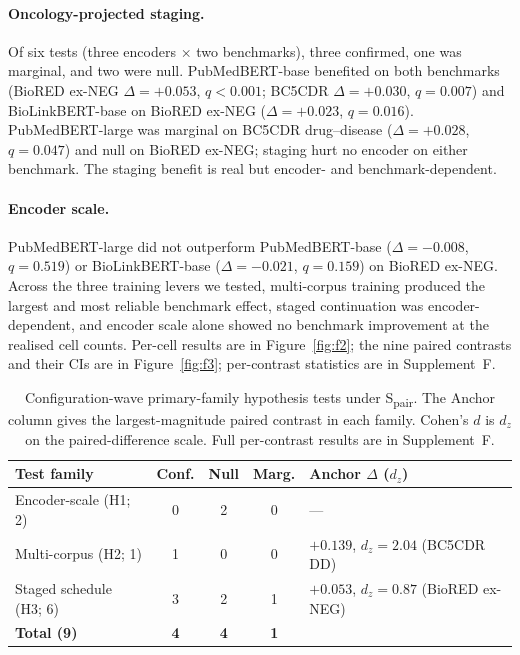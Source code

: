 \paragraph{Oncology-projected staging.}
Of six tests (three encoders \(\times\) two benchmarks), three
confirmed, one was marginal, and two were null. PubMedBERT-base
benefited on both benchmarks (BioRED ex-NEG \(\Delta=+0.053\),
\(q<0.001\); BC5CDR \(\Delta=+0.030\), \(q=0.007\)) and
BioLinkBERT-base on BioRED ex-NEG (\(\Delta=+0.023\), \(q=0.016\)).
PubMedBERT-large was marginal on BC5CDR drug--disease
(\(\Delta=+0.028\), \(q=0.047\)) and null on BioRED ex-NEG; staging
hurt no encoder on either benchmark. The staging benefit is real
but encoder- and benchmark-dependent.

\paragraph{Encoder scale.}
PubMedBERT-large did not outperform PubMedBERT-base
(\(\Delta=-0.008\), \(q=0.519\)) or BioLinkBERT-base
(\(\Delta=-0.021\), \(q=0.159\)) on BioRED ex-NEG. Across the
three training levers we tested, multi-corpus training produced the
largest and most reliable benchmark effect, staged continuation was
encoder-dependent, and encoder scale alone showed no benchmark
improvement at the realised cell counts. Per-cell results are in
Figure~\ref{fig:f2}; the nine paired contrasts and their CIs are in
Figure~\ref{fig:f3}; per-contrast statistics are in Supplement~F.

\begin{table}[!ht]
\centering
\caption{Configuration-wave primary-family hypothesis tests under
S\textsubscript{pair}. The Anchor column gives the
largest-magnitude paired contrast in each family. Cohen's $d$ is
$d_z$ on the paired-difference scale. Full per-contrast results
are in Supplement~F.}
\label{tab:t2}
\small
\begin{tabular}{@{}lcccp{3.5cm}@{}}
\toprule
\textbf{Test family} & \textbf{Conf.}
& \textbf{Null} & \textbf{Marg.} & \textbf{Anchor \(\Delta\) (\(d_z\))} \\
\midrule
Encoder-scale (H1; 2)    & 0 & 2 & 0 & --- \\
Multi-corpus (H2; 1)     & 1 & 0 & 0 & $+0.139$, $d_z\!=\!2.04$ (BC5CDR DD) \\
Staged schedule (H3; 6)  & 3 & 2 & 1 & $+0.053$, $d_z\!=\!0.87$ (BioRED ex-NEG) \\
\midrule
\textbf{Total (9)}       & \textbf{4} & \textbf{4} & \textbf{1} & \\
\bottomrule
\end{tabular}
\end{table}

